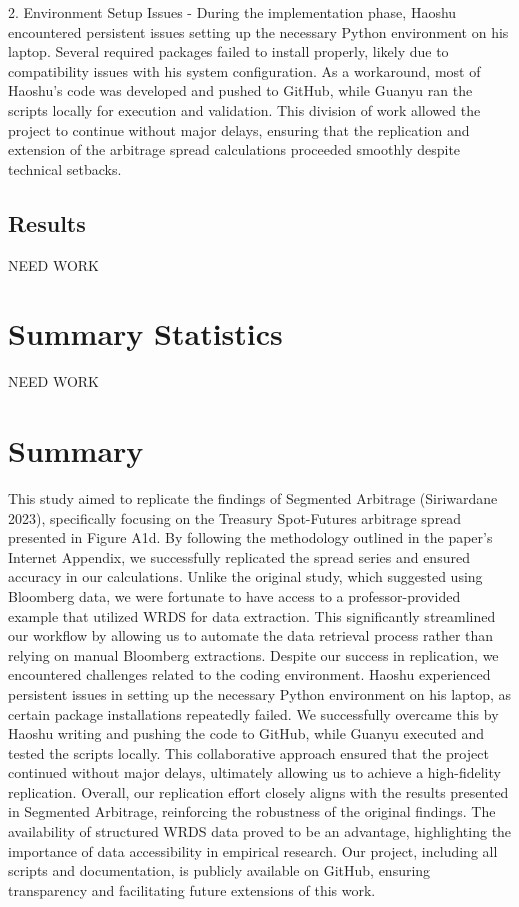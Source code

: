 \documentclass{article}
\begin{document}
2. Environment Setup Issues - During the implementation phase, Haoshu encountered persistent issues setting up the necessary Python environment on his laptop. Several required packages failed to install properly, likely due to compatibility issues with his system configuration. As a workaround, most of Haoshu’s code was developed and pushed to GitHub, while Guanyu ran the scripts locally for execution and validation. This division of work allowed the project to continue without major delays, ensuring that the replication and extension of the arbitrage spread calculations proceeded smoothly despite technical setbacks.


\newpage

\subsection{Results}


NEED WORK


\newpage


\section{Summary Statistics}

NEED WORK






\section{Summary}
This study aimed to replicate the findings of Segmented Arbitrage (Siriwardane 2023), specifically focusing on the Treasury Spot-Futures arbitrage spread presented in Figure A1d. By following the methodology outlined in the paper’s Internet Appendix, we successfully replicated the spread series and ensured accuracy in our calculations. Unlike the original study, which suggested using Bloomberg data, we were fortunate to have access to a professor-provided example that utilized WRDS for data extraction. This significantly streamlined our workflow by allowing us to automate the data retrieval process rather than relying on manual Bloomberg extractions.
Despite our success in replication, we encountered challenges related to the coding environment. Haoshu experienced persistent issues in setting up the necessary Python environment on his laptop, as certain package installations repeatedly failed. We successfully overcame this by Haoshu writing and pushing the code to GitHub, while Guanyu executed and tested the scripts locally. This collaborative approach ensured that the project continued without major delays, ultimately allowing us to achieve a high-fidelity replication.
Overall, our replication effort closely aligns with the results presented in Segmented Arbitrage, reinforcing the robustness of the original findings. The availability of structured WRDS data proved to be an advantage, highlighting the importance of data accessibility in empirical research. Our project, including all scripts and documentation, is publicly available on GitHub, ensuring transparency and facilitating future extensions of this work.
\end{document}
